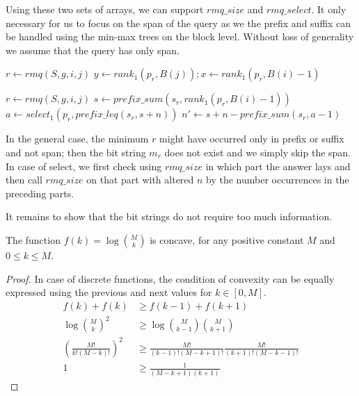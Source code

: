 Using these two sets of arrays, we can support $rmq\_size$ and $rmq\_select$.
It only necessary for us to focus on the span of the query as we the prefix and suffix can be handled using the min-max trees on the block level.
Without loss of generality we assume that the query has only span.

\begin{algorithmic}
	\State $r \gets rmq(S, g, i, j)$
	\State $y \gets rank_1(p_r, B(j)); x \gets rank_1(p_r, B(i) - 1)$
	\State {}
\EndFunction
\end{algorithmic}

\begin{algorithmic}
	\State $r \gets rmq(S, g, i, j)$
	\State $s \gets prefix\_sum(s_r, rank_1(p_r, B(i) - 1))$ 
	\State $a \gets select_1(p_r, prefix\_leq(s_r, s + n))$ 
	\State $n' \gets s + n - prefix\_sum(s_r, a - 1)$ 
	\State {}
\EndFunction
\end{algorithmic}

In the general case, the minimum $r$ might have occurred only in prefix or suffix and not span; then the bit string $m_r$ does not exist and we simply skip the span.
In case of select, we first check using $rmq\_size$ in which part the answer lays and then call $rmq\_size$ on that part with altered $n$ by the number occurrences in the preceding parts.

\iffalse

It remains to show that the bit strings do not require too much information.

\begin{lemma}
	The function $f(k) = \log {M \choose k}$ is concave, for any positive constant $M$ and $0 \le k \le M$.
\end{lemma}
\begin{proof}
	In case of discrete functions, the condition of convexity can be equally expressed using the previous and next values for $k \in [0, M]$.
	\begin{align*}
		f(k) + f(k) &\ge f(k-1) + f(k+1) \\
		\log {M \choose k}^2 &\ge \log {M \choose k - 1} {M \choose k + 1} \\
		\left(\frac{M!}{k! (M-k)!}\right)^2 &\ge \frac{M!}{(k - 1)! (M - k + 1)!} \frac{M!}{(k + 1)! (M - k - 1)!} \\
		1 &\ge \frac{1}{(M-k+1)(k+1)}
	\end{align*}
\end{proof}

